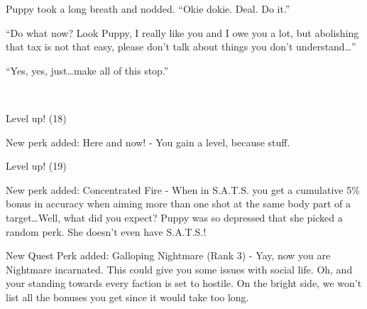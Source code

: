 Puppy took a long breath and nodded. ``Okie dokie. Deal. Do it.''


``Do what now? Look Puppy, I really like you and I owe you a lot, but abolishing that tax is not that easy, please don't talk about things you don't understand\dots''

``Yes, yes, just\dots make all of this stop.''


\clearpage


~\vfill

\begin{engnote}
		Level up! (18)
	
		New perk added: Here and now! - You gain a level, because stuff.
\end{engnote}

\begin{engnote}
		Level up! (19)
	
		New perk added: Concentrated Fire - When in S.A.T.S. you get a cumulative 5\% bonus in accuracy when aiming more than one shot at the same body part of a target\dots Well, what did you expect? Puppy was so depressed that she picked a random perk. She doesn't even have S.A.T.S.!
	
		New Quest Perk added: Galloping Nightmare (Rank 3) - Yay, now you are Nightmare incarnated. This could give you some issues with social life. Oh, and your standing towards every faction is set to hostile. On the bright side, we won't list all the bonuses you get since it would take too long.	
\end{engnote}


